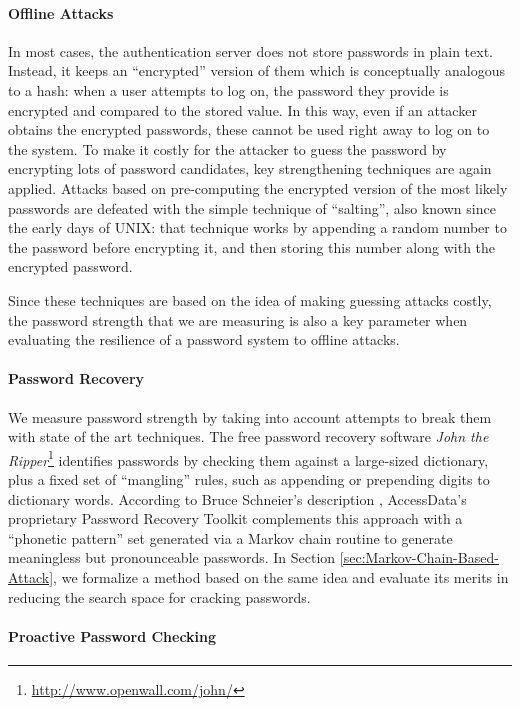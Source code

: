 \documentclass[a4paper,twocolumn]{article}
\begin{document}
\paragraph{Offline Attacks}

In most cases, the authentication server does not store passwords
in plain text. Instead, it keeps an {}``encrypted'' version of them
which is conceptually analogous to a hash: when a user attempts to
log on, the password they provide is encrypted and compared to the
stored value. In this way, even if an attacker obtains the encrypted
passwords, these cannot be used right away to log on to the system.
To make it costly for the attacker to guess the password by encrypting
lots of password candidates, key strengthening techniques are again
applied. Attacks based on pre-computing the encrypted version of the
most likely passwords \cite{Narayanan2005Fast,Oechslin2003Making}
are defeated with the simple technique of {}``salting'', also known
since the early days of UNIX: that technique works by appending a
random number to the password before encrypting it, and then storing
this number along with the encrypted password.

Since these techniques are based on the idea of making guessing attacks
costly, the password strength that we are measuring is also a key
parameter when evaluating the resilience of a password system to offline
attacks.


\paragraph{Password Recovery}

We measure password strength by taking into account attempts to break
them with state of the art techniques. The free password recovery
software \emph{John the Ripper}\footnote{\url{http://www.openwall.com/john/}} identifies passwords by checking them against a large-sized dictionary,
plus a fixed set of {}``mangling'' rules, such as appending or prepending
digits to dictionary words. According to Bruce Schneier's description
\cite{Schneier2007Schneier}, AccessData's proprietary Password Recovery
Toolkit complements this approach with a {}``phonetic pattern''
set generated via a Markov chain routine to generate meaningless but
pronounceable passwords. In Section \ref{sec:Markov-Chain-Based-Attack},
we formalize a method based on the same idea and evaluate its merits
in reducing the search space for cracking passwords.


\paragraph{Proactive Password Checking}
\end{document}
